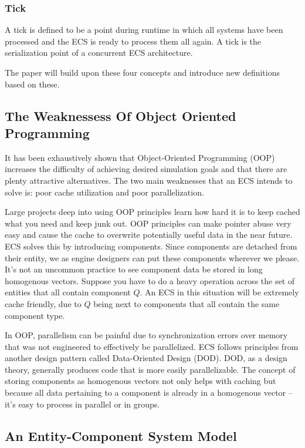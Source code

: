 \subsubsection{Tick}
    A tick is defined to be a point during runtime in which all systems have been processed and the ECS is ready to process them all again. A tick is the serialization point of a concurrent ECS architecture.

\noindent The paper will build upon these four concepts and introduce new definitions based on these.

\subsection{The Weaknessess Of Object Oriented Programming}

It has been exhaustively shown that Object-Oriented Programming (OOP) increases the difficulty of achieving desired simulation goals and that there are plenty attractive alternatives. The two main weaknesses that an ECS intends to solve is: poor cache utilization and poor parallelization.

Large projects deep into using OOP principles learn how hard it is to keep cached what you need and keep junk out. OOP principles can make pointer abuse very easy and cause the cache to overwrite potentially useful data in the near future. ECS solves this by introducing components. Since components are detached from their entity, we as engine designers can put these components wherever we please. It's not an uncommon practice to see component data be stored in long homogenous vectors. Suppose you have to do a heavy operation across the set of entities that all contain component $Q$. An ECS in this situation will be extremely cache friendly, due to $Q$ being next to components that all contain the same component type.

In OOP, parallelism can be painful due to synchronization errors over memory that was not engineered to effectively be parallelized. ECS follows principles from another design pattern called Data-Oriented Design (DOD). DOD, as a design theory, generally produces code that is more easily parallelizable. The concept of storing components as homogenous vectors not only helps with caching but because all data pertaining to a component is already in a homogenous vector -- it's easy to process in parallel or in groups.

\subsection{An Entity-Component System Model}

